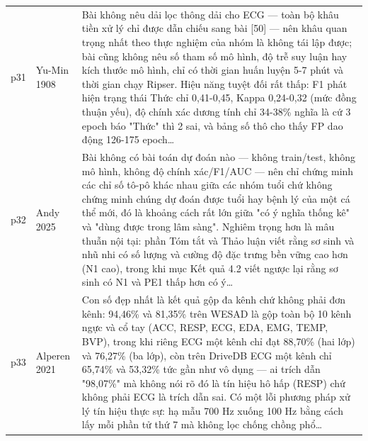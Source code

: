 \begin{longtable}{@{}L{1.05cm} L{3.2cm} L{10.1cm}@{}}
p31 & {\scriptsize Yu-Min 1908} & {\scriptsize Bài không nêu dải lọc thông dải cho ECG — toàn bộ khâu tiền xử lý chỉ được dẫn chiếu sang bài [50] — nên khâu quan trọng nhất theo thực nghiệm của nhóm là không tái lập được; bài cũng không nêu số tham số mô hình, độ trễ suy luận hay kích thước mô hình, chỉ có thời gian huấn luyện 5-7 phút và thời gian chạy Ripser. Hiệu năng tuyệt đối rất thấp: F1 phát hiện trạng thái Thức chỉ 0,41-0,45, Kappa 0,24-0,32 (mức đồng thuận yếu), độ chính xác dương tính chỉ 34-38\% nghĩa là cứ 3 epoch báo "Thức" thì 2 sai, và bảng số thô cho thấy FP dao động 126-175 epoch…} \\[2pt]
p32 & {\scriptsize Andy 2025} & {\scriptsize Bài không có bài toán dự đoán nào — không train/test, không mô hình, không độ chính xác/F1/AUC — nên chỉ chứng minh các chỉ số tô-pô khác nhau giữa các nhóm tuổi chứ không chứng minh chúng dự đoán được tuổi hay bệnh lý của một cá thể mới, đó là khoảng cách rất lớn giữa "có ý nghĩa thống kê" và "dùng được trong lâm sàng". Nghiêm trọng hơn là mâu thuẫn nội tại: phần Tóm tắt và Thảo luận viết rằng sơ sinh và nhũ nhi có số lượng và cường độ đặc trưng bền vững cao hơn (N1 cao), trong khi mục Kết quả 4.2 viết ngược lại rằng sơ sinh có N1 và PE1 thấp hơn có ý…} \\[2pt]
p33 & {\scriptsize Alperen 2021} & {\scriptsize Con số đẹp nhất là kết quả gộp đa kênh chứ không phải đơn kênh: 94,46\% và 81,35\% trên WESAD là gộp toàn bộ 10 kênh ngực và cổ tay (ACC, RESP, ECG, EDA, EMG, TEMP, BVP), trong khi riêng ECG một kênh chỉ đạt 88,70\% (hai lớp) và 76,27\% (ba lớp), còn trên DriveDB ECG một kênh chỉ 65,74\% và 53,32\% tức gần như vô dụng — ai trích dẫn "98,07\%" mà không nói rõ đó là tín hiệu hô hấp (RESP) chứ không phải ECG là trích dẫn sai. Có một lỗi phương pháp xử lý tín hiệu thực sự: hạ mẫu 700 Hz xuống 100 Hz bằng cách lấy mỗi phần tử thứ 7 mà không lọc chống chồng phổ…} \\[2pt]
\end{longtable}
